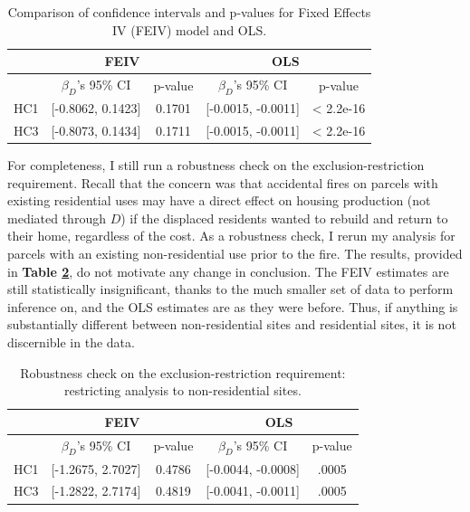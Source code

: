 \documentclass[a4paper,12pt]{article}
\begin{document}
\begin{table}[hbt]
\caption{Comparison of confidence intervals and p-values for Fixed Effects IV (FEIV) model and OLS.}
\label{tab:iv.mods}
\begin{tabular}{|c|c|c|c|c|}
\hline
 & \multicolumn{2}{c|}{FEIV} & \multicolumn{2}{c|}{OLS} \\
\hline
 & $\beta_{D}$'s 95\% CI & p-value & $\beta_{D}$'s 95\% CI  & p-value \\
\hline
HC1 & [-0.8062, 0.1423] & 0.1701 & [-0.0015, -0.0011] & < 2.2e-16  \\
\hline
HC3 & [-0.8073, 0.1434] &  0.1711 & [-0.0015, -0.0011] & < 2.2e-16 \\
\hline
\end{tabular}
\end{table}

For completeness, I still run a robustness check on the exclusion-restriction requirement. Recall that the concern was that accidental fires on parcels with existing residential uses may have a direct effect on housing production (not mediated through $D$) if the displaced residents wanted to rebuild and return to their home, regardless of the cost. As a robustness check, I rerun my analysis for parcels with an existing non-residential use prior to the fire. The results, provided in \textbf{Table \ref{tab:iv.mods.robust}}, do not motivate any change in conclusion. The FEIV estimates are still statistically insignificant, thanks to the much smaller set of data to perform inference on, and the OLS estimates are as they were before. Thus, if anything is substantially different between non-residential sites and residential sites, it is not discernible in the data.

\begin{table}[hbt]
\caption{Robustness check on the exclusion-restriction requirement: restricting analysis to non-residential sites.}
\label{tab:iv.mods.robust}
\begin{tabular}{|c|c|c|c|c|}
\hline
 & \multicolumn{2}{c|}{FEIV} & \multicolumn{2}{c|}{OLS} \\
\hline
 & $\beta_{D}$'s 95\% CI & p-value & $\beta_{D}$'s 95\% CI  & p-value \\
\hline
HC1 & [-1.2675, 2.7027] & 0.4786 & [-0.0044, -0.0008] & .0005  \\
\hline
HC3 & [-1.2822, 2.7174] & 0.4819 & [-0.0041, -0.0011] & .0005 \\
\hline

\end{tabular}
\end{table}
\end{document}

